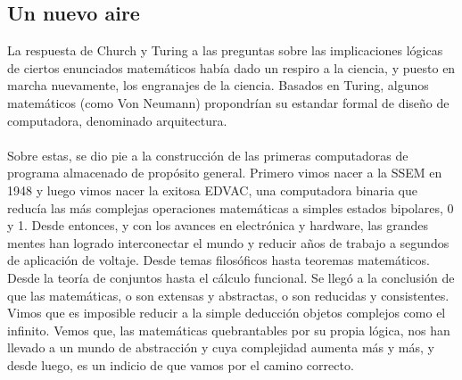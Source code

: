 \documentclass[12pt]{article}
\begin{document}
\begin{multicols}{2}
\section*{Un nuevo aire}
La respuesta de Church y Turing a las preguntas sobre las implicaciones lógicas de ciertos enunciados matemáticos había dado un respiro a la ciencia, y puesto en marcha nuevamente, los engranajes de la ciencia. Basados en Turing, algunos matemáticos (como Von Neumann) propondrían su estandar formal de diseño de computadora, denominado arquitectura\cite{Mar}.\\\\
\indent Sobre estas, se dio pie a la construcción de las primeras computadoras de programa almacenado de propósito general. Primero vimos nacer a la SSEM en 1948 y luego vimos nacer la exitosa EDVAC, una computadora binaria que reducía las más complejas operaciones matemáticas a simples estados bipolares, 0 y 1. Desde entonces, y con los avances en electrónica y hardware, las grandes mentes han logrado interconectar el mundo y reducir años de trabajo a segundos de aplicación de voltaje.
\indent Desde temas filosóficos hasta teoremas matemáticos. Desde la teoría de conjuntos hasta el cálculo funcional. Se llegó a la conclusión de que las matemáticas, o son extensas y abstractas, o son reducidas y consistentes. Vimos que es imposible reducir a la simple deducción objetos complejos como el infinito. Vemos que, las matemáticas quebrantables por su propia lógica, nos han llevado a un mundo de abstracción y cuya complejidad aumenta más y más, y desde luego, es un indicio de que vamos por el camino correcto.
\end{multicols}
\end{document}
